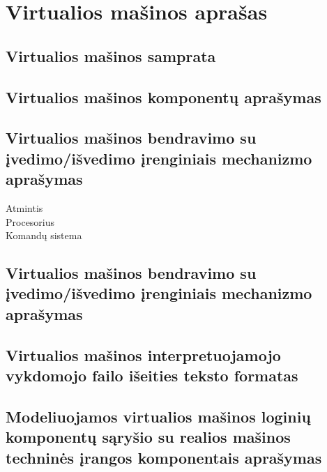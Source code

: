 \section{Virtualios mašinos aprašas}

\subsection{Virtualios mašinos samprata}

\subsection{Virtualios mašinos komponentų aprašymas}

\subsection{Virtualios mašinos bendravimo su įvedimo/išvedimo įrenginiais
mechanizmo aprašymas}
\begin{description}
  \item[Atmintis] 
  \item[Procesorius]
  \item[Komandų sistema]
   \hfill
  \end{description}   
   
\subsection{Virtualios mašinos bendravimo su įvedimo/išvedimo įrenginiais
mechanizmo aprašymas}

\subsection{Virtualios mašinos interpretuojamojo vykdomojo failo išeities 
teksto formatas}

\subsection{Modeliuojamos virtualios mašinos loginių komponentų sąryšio su 
realios mašinos techninės įrangos komponentais aprašymas}

   

